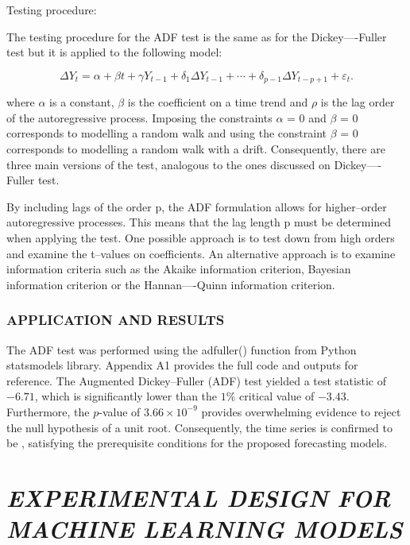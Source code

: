 \documentclass[12pt,a4paper]{report}
\numberwithin{equation}{section}
\begin{document}
Testing procedure:

The testing procedure for the ADF test is the same as for the
Dickey----Fuller test but it is applied to the following model:

\begin{equation}\label{eq:3.1.4}
\Delta Y_t
= \alpha + \beta t + \gamma Y_{t-1}
+ \delta_{1}\Delta Y_{t-1} + \cdots + \delta_{p-1}\Delta Y_{t-p+1}
+ \varepsilon_t .
\end{equation}


where $\alpha$ is a constant, $\beta$ is the coefficient on a time trend and $\rho$ is the
lag order of the autoregressive process. Imposing the constraints $\alpha$ = 0
and $\beta$ = 0 corresponds to modelling a random walk and using the
constraint $\beta$ = 0 corresponds to modelling a random walk with a drift.
Consequently, there are three main versions of the test, analogous to
the ones discussed on Dickey----Fuller test.

By including lags of the order p, the ADF formulation allows for
higher--order autoregressive processes. This means that the lag length p
must be determined when applying the test. One possible approach is to
test down from high orders and examine the t--values on coefficients. An
alternative approach is to examine information criteria such as the
Akaike information criterion, Bayesian information criterion or the
Hannan----Quinn information criterion.

\hypertarget{application--and--results}{%
\subsubsection{APPLICATION AND RESULTS}\label{application--and--results}}

The ADF test was performed using the adfuller() function from Python
statsmodels library. Appendix A1 provides the full code and outputs for
reference. The Augmented Dickey--Fuller (ADF) test yielded a test statistic of $-6.71$, which is significantly lower than the $1\%$ critical value of $-3.43$. Furthermore, the $p$-value of $3.66 \times 10^{-9}$ provides overwhelming evidence to reject the null hypothesis of a unit root. Consequently, the time series is confirmed to be , satisfying the prerequisite conditions for the proposed forecasting models.

\hypertarget{experimental--design--for--machine--learning--models}{%
\section{\texorpdfstring{\emph{\textbf{EXPERIMENTAL DESIGN FOR
MACHINE LEARNING MODELS}}
}{EXPERIMENTAL DESIGN FOR MACHINE LEARNING MODELS }}\label{experimental--design--for--machine--learning--models}}
\end{document}
